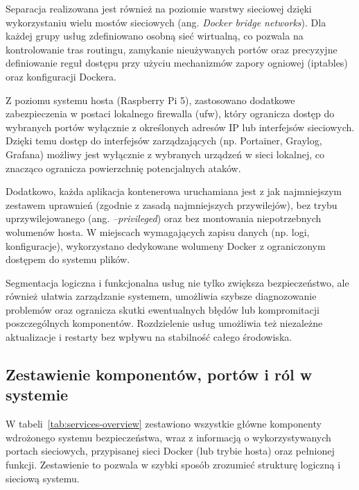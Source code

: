 \documentclass[
    left=2.5cm,         %
    right=2.5cm,        %
    top=2.5cm,          %
    bottom=3cm,         %
    bindingoffset=6mm,  %
    nohyphenation=true %
]{eiti/eiti-thesis} %
\begin{document}
Separacja realizowana jest również na poziomie warstwy sieciowej dzięki wykorzystaniu wielu mostów sieciowych (ang. \textit{Docker bridge networks}). Dla każdej grupy usług zdefiniowano osobną sieć wirtualną, co pozwala na kontrolowanie tras routingu, zamykanie nieużywanych portów oraz precyzyjne definiowanie reguł dostępu przy użyciu mechanizmów zapory ogniowej (iptables) oraz konfiguracji Dockera.

Z poziomu systemu hosta (Raspberry Pi 5), zastosowano dodatkowe zabezpieczenia w postaci lokalnego firewalla (ufw), który ogranicza dostęp do wybranych portów wyłącznie z określonych adresów IP lub interfejsów sieciowych. Dzięki temu dostęp do interfejsów zarządzających (np. Portainer, Graylog, Grafana) możliwy jest wyłącznie z wybranych urządzeń w sieci lokalnej, co znacząco ogranicza powierzchnię potencjalnych ataków.

Dodatkowo, każda aplikacja kontenerowa uruchamiana jest z jak najmniejszym zestawem uprawnień (zgodnie z zasadą najmniejszych przywilejów), bez trybu uprzywilejowanego (ang. \textit{--privileged}) oraz bez montowania niepotrzebnych wolumenów hosta. W miejscach wymagających zapisu danych (np. logi, konfiguracje), wykorzystano dedykowane wolumeny Docker z ograniczonym dostępem do systemu plików.

Segmentacja logiczna i funkcjonalna usług nie tylko zwiększa bezpieczeństwo, ale również ułatwia zarządzanie systemem, umożliwia szybsze diagnozowanie problemów oraz ogranicza skutki ewentualnych błędów lub kompromitacji poszczególnych komponentów. Rozdzielenie usług umożliwia też niezależne aktualizacje i restarty bez wpływu na stabilność całego środowiska.

\newpage
\subsection{Zestawienie komponentów, portów i ról w systemie}

W tabeli~\ref{tab:services-overview} zestawiono wszystkie główne komponenty wdrożonego systemu bezpieczeństwa, wraz z informacją o wykorzystywanych portach sieciowych, przypisanej sieci Docker (lub trybie hosta) oraz pełnionej funkcji. Zestawienie to pozwala w szybki sposób zrozumieć strukturę logiczną i sieciową systemu.
\end{document}
